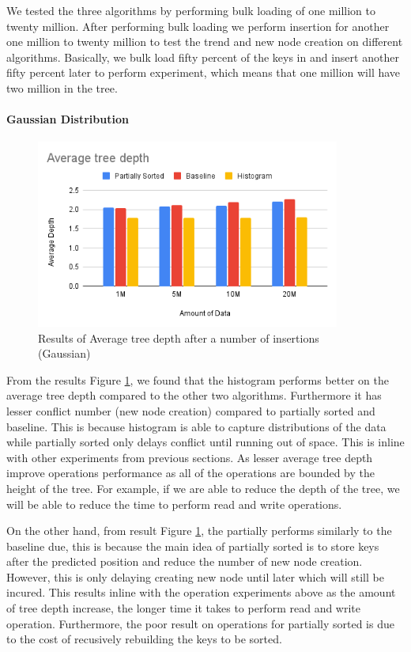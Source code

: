 \documentclass[11pt,a4paper]{article}
\newcommand{\conflict}{\textsf{conflict}\xspace}
\begin{document}
We tested the three algorithms by performing bulk loading of one million to twenty million. After performing bulk loading we perform insertion for another one million to twenty million to test the trend and new node creation on different algorithms. Basically, we bulk load fifty percent of the keys in and insert another fifty percent later to perform experiment, which means that one million will have two million in the tree. 

\paragraph{Gaussian Distribution}
\begin{figure}
    \centering
    \includegraphics[width=100mm,scale=1]{Figures/AVGTD-Gau.png}
    \caption{
     Results of Average tree depth after a number of insertions (Gaussian)
    }
    \label{fig:AverageTreeDepthGau}
\end{figure}

From the results Figure \ref{fig:AverageTreeDepthGau}, we found that the histogram performs better on the average tree depth compared to the other two algorithms. Furthermore it has lesser \conflict number (new node creation) compared to partially sorted and baseline. This is because histogram is able to capture distributions of the data while partially sorted only delays \conflict until running out of space. This is inline with other experiments from previous sections. As lesser average tree depth improve operations performance as all of the operations are bounded by the height of the tree. For example, if we are able to reduce the depth of the tree, we will be able to reduce the time to perform read and write operations.

On the other hand, from result Figure \ref{fig:AverageTreeDepthGau}, the partially performs similarly to the baseline due, this is because the main idea of partially sorted is to store keys after the predicted position and reduce the number of new node creation. However, this is only delaying creating new node until later which will still be incured. This results inline with the operation experiments above as the amount of tree depth increase, the longer time it takes to perform read and write operation. Furthermore, the poor result on operations for partially sorted is due to the cost of recusively rebuilding the keys to be sorted.
\end{document}
